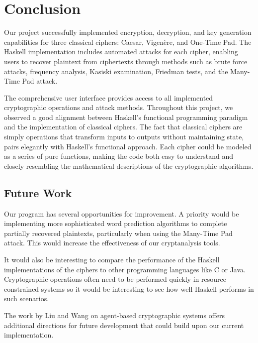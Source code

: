 
\section{Conclusion}\label{sec:Conclusion}

Our project successfully implemented encryption, decryption, and key generation capabilities for three classical ciphers: 
Caesar, Vigenère, and One-Time Pad. 
The Haskell implementation includes automated attacks for each cipher, enabling users to recover plaintext from ciphertexts through methods such as 
brute force attacks, frequency analysis, Kasiski examination, Friedman tests, and the Many-Time Pad attack.

The comprehensive user interface provides access to all implemented cryptographic operations and attack methods. 
Throughout this project, we observed a good alignment between Haskell's functional programming paradigm and the implementation of classical ciphers. 
The fact that classical ciphers are simply operations that transform inputs to outputs without maintaining state, 
pairs elegantly with Haskell's functional approach. 
Each cipher could be modeled as a series of pure functions, making the code both easy to understand 
and closely resembling the mathematical descriptions of the cryptographic algorithms.

\subsection{Future Work}
Our program has several opportunities for improvement. 
A priority would be implementing more sophisticated word prediction algorithms to complete partially recovered plaintexts, 
particularly when using the Many-Time Pad attack. This would increase the effectiveness of our cryptanalysis tools.

It would also be interesting to compare the performance of the Haskell implementations of the
ciphers to other programming languages like C or Java. Cryptographic operations often need to
be performed quickly in resource constrained systems so it would be interesting to see how well
Haskell performs in such scenarios.

The work by Liu and Wang on agent-based cryptographic systems \cite{liuWang2013:agentTypesHLPE} offers additional directions 
for future development that could build upon our current implementation.
